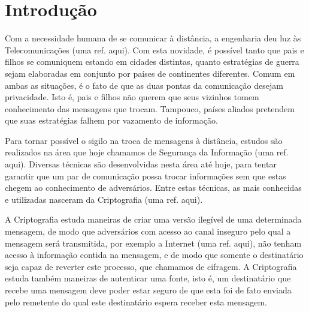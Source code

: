 \chapter{Introdução}



Com a necessidade humana de se comunicar à distância, a engenharia deu luz às Telecomunicações (uma ref. aqui). Com esta novidade, é possível tanto que pais e filhos se comuniquem estando em cidades distintas, quanto estratégias de guerra sejam elaboradas em conjunto por países de continentes diferentes. Comum em ambas as situações, é o fato de que as duas pontas da comunicação desejam privacidade. Isto é, pais e filhos não querem que seus vizinhos tomem conhecimento das mensagens que trocam. Tampouco, países aliados pretendem que suas estratégias falhem por vazamento de informação.

Para tornar possível o sigilo na troca de mensagens à distância, estudos são realizados na área que hoje chamamos de Segurança da Informação (uma ref. aqui). Diversas técnicas são desenvolvidas nesta área até hoje, para tentar garantir que um par de comunicação possa trocar informações sem que estas chegem ao conhecimento de adversários. Entre estas técnicas, as mais conhecidas e utilizadas nasceram da Criptografia (uma ref. aqui).

A Criptografia estuda maneiras de criar uma versão ilegível de uma determinada mensagem, de modo que adversários com acesso ao canal inseguro pelo qual a mensagem será transmitida, por exemplo a Internet (uma ref. aqui), não tenham acesso à informação contida na mensagem, e de modo que somente o destinatário seja capaz de reverter este processo, que chamamos de cifragem. A Criptografia estuda também maneiras de autenticar uma fonte, isto é, um destinatário que recebe uma mensagem deve poder estar seguro de que esta foi de fato enviada pelo remetente do qual este destinatário espera receber esta mensagem.

